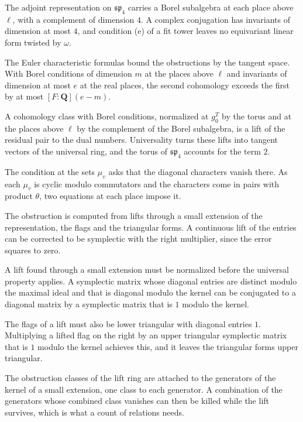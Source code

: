 The adjoint representation on $\mathfrak{sp}_4$ carries a Borel subalgebra at each place above $\ell$, with a complement of dimension $4$. A complex conjugation has invariants of dimension at most $4$, and condition (e) of a fit tower leaves no equivariant linear form twisted by $\omega$.

The Euler characteristic formulas bound the obstructions by the tangent space. With Borel conditions of dimension $m$ at the places above $\ell$ and invariants of dimension at most $e$ at the real places, the second cohomology exceeds the first by at most $[F:\mathbf Q](e-m)$.

A cohomology class with Borel conditions, normalized at $g_0^T$ by the torus and at the places above $\ell$ by the complement of the Borel subalgebra, is a lift of the residual pair to the dual numbers. Universality turns these lifts into tangent vectors of the universal ring, and the torus of $\mathfrak{sp}_4$ accounts for the term $2$.

The condition at the sets $\mu_v$ asks that the diagonal characters vanish there. As each $\mu_v$ is cyclic modulo commutators and the characters come in pairs with product $\theta$, two equations at each place impose it.

The obstruction is computed from lifts through a small extension of the representation, the flags and the triangular forms. A continuous lift of the entries can be corrected to be symplectic with the right multiplier, since the error squares to zero.

A lift found through a small extension must be normalized before the universal property applies. A symplectic matrix whose diagonal entries are distinct modulo the maximal ideal and that is diagonal modulo the kernel can be conjugated to a diagonal matrix by a symplectic matrix that is $1$ modulo the kernel.

The flags of a lift must also be lower triangular with diagonal entries $1$. Multiplying a lifted flag on the right by an upper triangular symplectic matrix that is $1$ modulo the kernel achieves this, and it leaves the triangular forms upper triangular.

The obstruction classes of the lift ring are attached to the generators of the kernel of a small extension, one class to each generator. A combination of the generators whose combined class vanishes can then be killed while the lift survives, which is what a count of relations needs.

